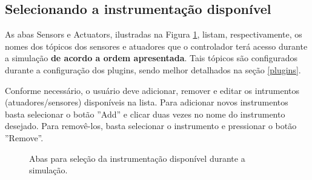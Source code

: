 \subsection{Selecionando a instrumentação disponível}
\label{sensoresatuadores}

As abas Sensors e Actuators, ilustradas na Figura \ref{6}, listam, respectivamente, os nomes dos tópicos dos sensores e atuadores que o controlador terá acesso durante a simulação \textbf{de acordo a ordem apresentada}. Tais tópicos são configurados durante a configuração dos plugins, sendo melhor detalhados na seção \ref{plugins}. 

Conforme necessário, o usuário deve adicionar, remover e editar os intrumentos (atuadores/sensores) disponíveis na lista. Para adicionar novos instrumentos basta selecionar o botão ''Add'' e clicar duas vezes no nome do instrumento desejado. Para removê-los, basta selecionar o instrumento e pressionar o botão ''Remove''. 

\begin{figure}
	\hfill
	\hfill
	\hfill
	\caption{Abas para seleção da instrumentação disponível durante a simulação.}
	\label{6}
\end{figure}


